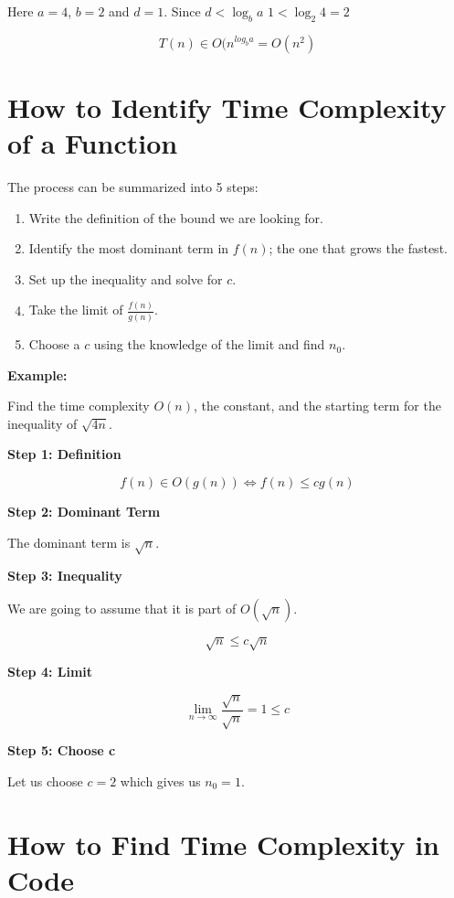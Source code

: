 Here \(a = 4\), \(b = 2\) and \(d = 1\). Since \(d < \log_b a\) \(1 < \log_2 4 = 2\) 

\[
    T(n) \in O(n^{log_b a} = O(n^2)
\]    

\section{How to Identify Time Complexity of a Function}

The process can be summarized into 5 steps:

\begin{enumerate}
    
    \item Write the definition of the bound we are looking for.
    
    \item Identify the most dominant term in \(f(n)\); the one that grows the fastest.
    
    \item Set up the inequality and solve for \(c\).
    
    \item Take the limit of \(\frac{f(n)}{g(n)}\).
    
    \item Choose a \(c\) using the knowledge of the limit and find \(n_0\). 

\end{enumerate}

\textbf{Example:}

Find the time complexity \(O(n)\), the constant, and the starting term for the inequality of \(\sqrt{4n}\).

\textbf{Step 1: Definition}

\[
    f(n) \in O(g(n)) \iff f(n) \le c g(n)
\]

\textbf{Step 2: Dominant Term}

The dominant term is \(\sqrt{n}\).

\textbf{Step 3: Inequality}

We are going to assume that it is part of \(O(\sqrt{n})\). 

\[
    \sqrt{n} \le c \sqrt{n}
\]

\textbf{Step 4: Limit}

\[
    \lim_{n \to \infty} \frac{\sqrt{n}}{\sqrt{n}} = 1 \le c
\]

\textbf{Step 5: Choose c}

Let us choose \(c = 2\) which gives us \(n_0 = 1\).

\section{How to Find Time Complexity in Code}

